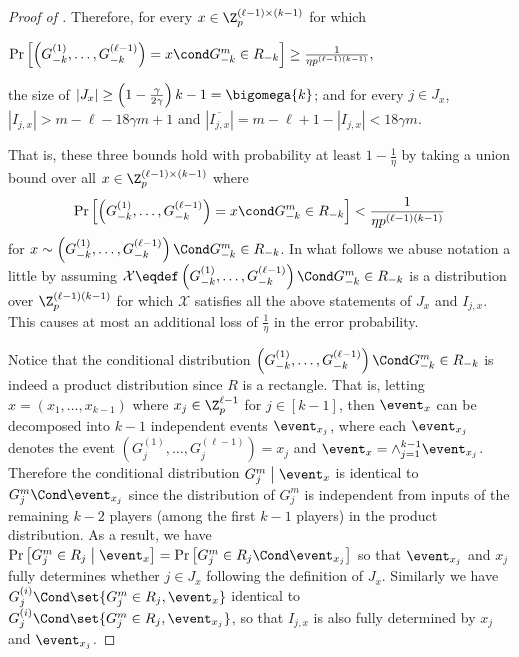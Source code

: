 \begin{proof}[Proof of ]
		
		Therefore, for every $x\in \Z_p^{(\ell-1)\times(k-1)}$ for which 
		\begin{center}$\Pr\left[\left(G_{-k}^{(1)},\dots,G_{-k}^{(\ell-1)}\right)=x \cond G_{-k}^m\in R_{-k} \right] \ge \frac{1}{\eta  p^{(\ell-1)(k-1)}},$\end{center} 
		the size of $|J_x|\ge \left(1-\frac{\gamma}{2\gamma}\right)k-1=\bigomega{k}$; and for every  $j\in J_x$, 
		$|I_{j,x}|>m-\ell - 18\gamma m + 1$ and $\left|\overline{I_{j,x}}\right|=m-\ell+1 - |I_{j,x}| <18\gamma m$.
		
		That is, these three bounds hold with probability 
		at least $1-\frac{1}{\eta}$ by taking a union bound over all $x \in \Z_p^{(\ell-1)\times(k-1)}$ where
		$$\Pr\left[\left(G_{-k}^{(1)},\dots,G_{-k}^{(\ell-1)}\right)=x \cond G_{-k}^m\in R_{-k} \right] < \frac{1}{\eta  p^{(\ell-1)(k-1)}}$$
		for 
		$x\sim\left(G_{-k}^{(1)},\dots,G_{-k}^{(\ell-1)}\right)\Cond G_{-k}^m\in R_{-k}$.
		In what follows we abuse notation a little by assuming $\mathcal{X}\eqdef \left(G_{-k}^{(1)},\dots,G_{-k}^{(\ell-1)}\right)\Cond G_{-k}^m\in R_{-k}$ is a distribution over $\Z_p^{(\ell-1)(k-1)}$ for which $\mathcal{X}$ satisfies all the above statements of $J_x$ and $I_{j,x}$.
		This causes at most an additional loss of $\frac{1}{\eta}$ in the error probability.


		Notice that 
		the conditional distribution $\left(G_{-k}^{(1)},\dots,G_{-k}^{(\ell-1)}\right)\Cond G_{-k}^m\in R_{-k}$ is indeed a product distribution since $R$ is a rectangle.
		That is, letting $x=(x_1,\dots, x_{k-1})$ where $x_j\in \Z_p^{\ell-1}$ for $j\in [k-1]$,
		then $\event_x$ can be decomposed into $k-1$ independent events $\event_{x_j}$, 
		where each $\event_{x_j}$ denotes the event $\left(G_{j}^{(1)},\dots,G_{j}^{(\ell-1)}\right)=x_j$ and $\event_x=\wedge_{j=1}^{k-1}\event_{x_j}$. 
		Therefore the conditional distribution
		$G^m_j \; \big| \; \event_x$ is identical to $G_j^m \Cond  \event_{x_j}$ since the distribution of $G^m_j$ is independent from inputs of the remaining $k-2$ players (among the first $k-1$ players) in the product distribution. 
		As a result, we have
		$\Pr\left[G^m_j\in R_j\; \big| \; \event_x\right] = \Pr\left[ G_j^m\in R_j \Cond  \event_{x_j} \right]$
		so that $\event_{x_j}$ and $x_j$ fully determines whether $j\in J_x$ following the definition of $J_x$.
		Similarly we have $G_j^{(i)}\Cond \set{G_j^m\in R_j,\event_x}$ identical to $G_j^{(i)}\Cond \set{G_j^m\in R_j,\event_{x_j}}$, 
		so that $I_{j,x}$ is also fully determined by $x_j$ and $\event_{x_j}$.


\end{proof}
